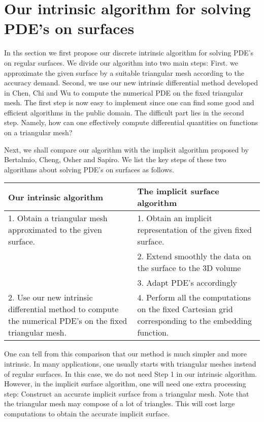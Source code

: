 \documentclass{elsart}
\begin{document}
\section{Our intrinsic algorithm for solving PDE's on surfaces}
    In ths section we first propose our discrete intrinsic algorithm for
solving PDE's on regular surfaces. We divide our algorithm into two
main steps: First. we approximate the given surface by a suitable
triangular mesh according to the accuracy demand. Second, we use our
new intrinsic differential method developed in Chen, Chi and
Wu\cite{Chen5} to compute the numerical PDE on the fixed triangular
mesh. The first step is now easy to implement since one can find
some good and efficient algorithms in the public domain. The
difficult part lies in the second step. Namely, how can one
effectively compute differential quantities on functions on a
triangular mesh?


  Next, we shall compare our algorithm with the implicit algorithm
proposed by Bertalmio, Cheng, Osher and Sapiro\cite{Bertalmio}. We
list the key steps of these two algorithms about solving PDE's on
surfaces as follows.

\begin{table}[h]

\begin{tabular}{|p{6cm}|p{6cm}|}
\hline  Our intrinsic algorithm & The implicit surface algorithm \\
\hline
 1.
Obtain a triangular mesh approximated to the given surface. & 1.
Obtain an implicit representation of the given fixed surface. \\

\hline
 & 2. Extend smoothly the data on the surface to the 3D
volume \\
 \hline
 & 3. Adapt PDE's accordingly \\
 \hline
 2. Use our new intrinsic differential method to compute the
numerical PDE's on the fixed triangular mesh.  &  4. Perform all the
computations on the fixed Cartesian grid corresponding to the
embedding function. \\
 \hline
\end{tabular}

\end{table}



    One can tell from this comparison that our method is much simpler
and more intrinsic. In many applications, one usually starts with
triangular meshes instead of regular surfaces. In this case, we do
not need Step 1 in our intrinsic algorithm. However, in the implicit
surface algorithm, one will need one extra processing step:
Construct an accurate implicit surface from a triangular mesh. Note
that the triangular mesh may compose of a lot of triangles. This
will cost large computations to obtain the accurate implicit
surface.
\end{document}
